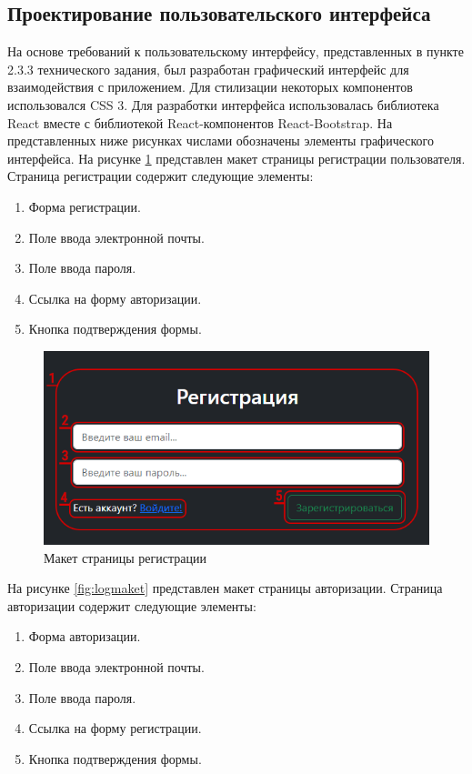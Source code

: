 \subsection{Проектирование пользовательского интерфейса}

На основе требований к пользовательскому интерфейсу, представленных в пункте 2.3.3 технического задания, был разработан графический интерфейс для взаимодействия с приложением. Для стилизации некоторых компонентов использовался CSS 3. Для разработки интерфейса использовалась библиотека React вместе с библиотекой React-компонентов React-Bootstrap. На представленных ниже рисунках числами обозначены элементы графического интерфейса. На рисунке \ref{fig:regmaket} представлен макет страницы регистрации пользователя. Страница регистрации содержит следующие элементы:

\begin{enumerate}
	\item Форма регистрации.
	\item Поле ввода электронной почты.
	\item Поле ввода пароля.
	\item Ссылка на форму авторизации.
	\item Кнопка подтверждения формы.
\end{enumerate}

\begin{figure}
	\centering
	\includegraphics[width=0.7\linewidth]{images/reg_maket}
	\caption{Макет страницы регистрации}
	\label{fig:regmaket}
\end{figure}

На рисунке \ref{fig:logmaket} представлен макет страницы авторизации. Страница авторизации содержит следующие элементы:

\begin{enumerate}
	\item Форма авторизации.
	\item Поле ввода электронной почты.
	\item Поле ввода пароля.
	\item Ссылка на форму регистрации.
	\item Кнопка подтверждения формы.
\end{enumerate}

